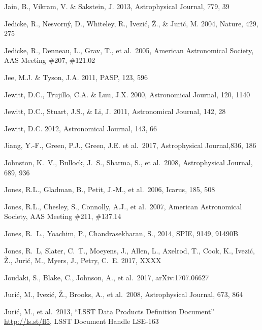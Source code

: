 \documentclass[twocolumn]{aastex61}
\begin{document}
\begin{thebibliography}{}
 Jain, B., Vikram, V. \& Sakstein, J. 2013, Astrophysical Journal, 779, 39

 Jedicke, R., Nesvorn{\'y}, D., Whiteley, R., Ivezi{\'c}, {\v Z}., \& Juri{\'c}, M. 2004, Nature, 429, 275

 Jedicke, R., Denneau, L., Grav, T., et al.~2005, American Astronomical Society, AAS Meeting \#207, \#121.02

 Jee, M.J. \& Tyson, J.A. 2011, PASP, 123, 596

 Jewitt, D.C., Trujillo, C.A. \& Luu, J.X. 2000, Astronomical Journal, 120, 1140

 Jewitt, D.C., Stuart, J.S., \& Li, J. 2011, Astronomical Journal, 142, 28

 Jewitt, D.C. 2012, Astronomical Journal, 143, 66

 Jiang, Y.-F., Green, P.J., Green, J.E. et al.~2017, Astrophysical Journal,836, 186

 Johnston, K.~V., Bullock, J.~S., Sharma, S., et al.~2008, Astrophysical Journal, 689, 936

 Jones, R.L., Gladman, B., Petit, J.-M., et al.~2006, Icarus, 185, 508

 Jones, R.L., Chesley, S., Connolly, A.J., et al.~2007, American Astronomical Society, AAS Meeting \#211, \#137.14

 Jones, R.~L., Yoachim, P., Chandrasekharan, S., 2014, SPIE, 9149, 91490B

 Jones, R.~L, Slater, C.~T., Moeyens, J., Allen, L., Axelrod, T., Cook, K., Ivezi\'{c}, \v{Z}.,  Juri\'{c}, M., Myers, J., Petry, C.~E. 2017, XXXX

 Joudaki, S., Blake, C., Johnson, A., et al.~2017, arXiv:1707.06627

 Juri\'{c}, M., Ivezi\'c, \v Z., Brooks, A., et al.~2008, Astrophysical Journal, 673, 864

 Juri\'{c}, M., et al.~2013, ``LSST Data Products Definition Document'' \url{http://ls.st/fl5}, LSST Document Handle LSE-163


\end{thebibliography}
\end{document}
